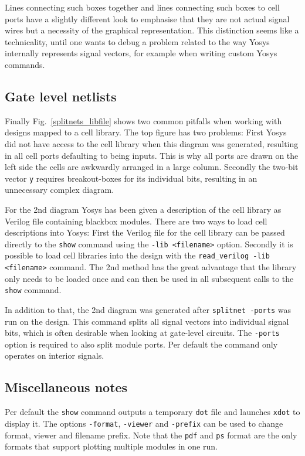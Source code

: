 \documentclass[9pt,technote,a4paper]{IEEEtran}
\begin{document}
Lines connecting such boxes together and lines connecting such boxes to cell
ports have a slightly different look to emphasise that they are not actual signal
wires but a necessity of the graphical representation. This distinction seems
like a technicality, until one wants to debug a problem related to the way
Yosys internally represents signal vectors, for example when writing custom
Yosys commands.

\subsection{Gate level netlists}

Finally Fig.~\ref{splitnets_libfile} shows two common pitfalls when working
with designs mapped to a cell library. The top figure has two problems: First
Yosys did not have access to the cell library when this diagram was generated,
resulting in all cell ports defaulting to being inputs. This is why all ports
are drawn on the left side the cells are awkwardly arranged in a large column.
Secondly the two-bit vector {\tt y} requires breakout-boxes for its individual
bits, resulting in an unnecessary complex diagram.

For the 2nd diagram Yosys has been given a description of the cell library as
Verilog file containing blackbox modules. There are two ways to load cell
descriptions into Yosys: First the Verilog file for the cell library can be
passed directly to the {\tt show} command using the {\tt -lib <filename>}
option. Secondly it is possible to load cell libraries into the design with
the {\tt read\_verilog -lib <filename>} command. The 2nd method has the great
advantage that the library only needs to be loaded once and can then be used
in all subsequent calls to the {\tt show} command.

In addition to that, the 2nd diagram was generated after {\tt splitnet -ports}
was run on the design. This command splits all signal vectors into individual
signal bits, which is often desirable when looking at gate-level circuits. The
{\tt -ports} option is required to also split module ports. Per default the
command only operates on interior signals.

\subsection{Miscellaneous notes}

Per default the {\tt show} command outputs a temporary {\tt dot} file and launches
{\tt xdot} to display it. The options {\tt -format}, {\tt -viewer}
and {\tt -prefix} can be used to change format, viewer and filename prefix.
Note that the {\tt pdf} and {\tt ps} format are the only formats that support
plotting multiple modules in one run.
\end{document}

